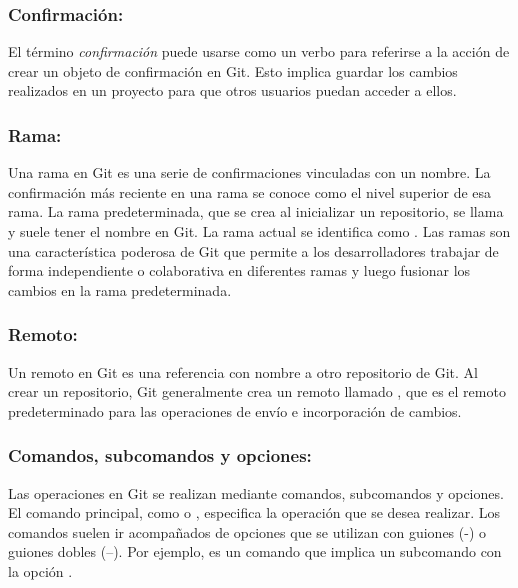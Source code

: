 \subsubsection*{Confirmación:}
El término \textit{confirmación} puede usarse como un verbo para referirse a la acción de crear un objeto
de confirmación en Git. Esto implica guardar los cambios realizados en un proyecto para que otros usuarios puedan acceder a ellos.

\subsubsection*{Rama:}
Una rama en Git es una serie de confirmaciones vinculadas con un nombre. La confirmación más reciente en una rama
se conoce como el nivel superior de esa rama. La rama predeterminada, que se crea al inicializar un repositorio,
se llama  y suele tener el nombre  en Git. La rama actual se identifica como .
Las ramas son una característica poderosa de Git que permite a los desarrolladores trabajar de forma independiente o colaborativa
en diferentes ramas y luego fusionar los cambios en la rama predeterminada.

\subsubsection*{Remoto:}
Un remoto en Git es una referencia con nombre a otro repositorio de Git. Al crear un repositorio, Git generalmente 
crea un remoto llamado , que es el remoto predeterminado para las operaciones de envío e incorporación de cambios.

\subsubsection*{Comandos, subcomandos y opciones:}
Las operaciones en Git se realizan mediante comandos, subcomandos y opciones. El comando principal,
como  o , especifica la operación que se desea realizar. Los comandos suelen ir acompañados de 
opciones que se utilizan con guiones (-) o guiones dobles (--). Por ejemplo,  es un comando que
implica un subcomando  con la opción .



